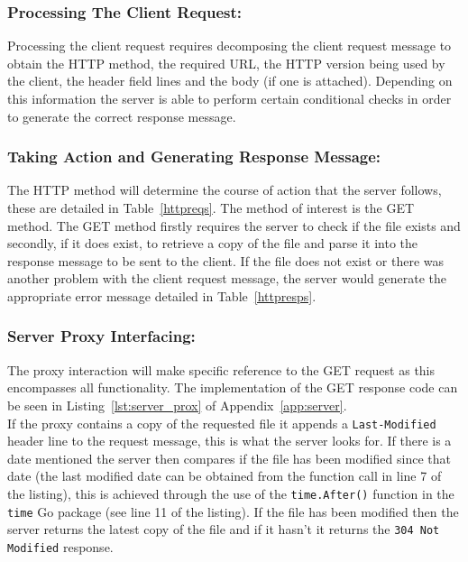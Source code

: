 \documentclass[10pt,twocolumn]{witseiepaper}
\begin{document}
		\subsubsection*{Processing The Client Request:} Processing the client request requires decomposing the client request message to obtain the HTTP method, the required URL, the HTTP version being used by the client, the header field lines and the body (if one is attached). Depending on this information the server is able to perform certain conditional checks in order to generate the correct response message. 
		
		\subsubsection*{Taking Action and Generating Response Message:} The HTTP method will determine the course of action that the server follows, these are detailed in Table~\ref{httpreqs}. The method of interest is the GET method. The GET method firstly requires the server to check if the file exists and secondly, if it does exist, to retrieve a copy of the file and parse it into the response message to be sent to the client. If the file does not exist or there was another problem with the client request message, the server would generate the appropriate error message detailed in Table~\ref{httpresps}.
		
		\subsubsection*{Server Proxy Interfacing:} The proxy interaction will make specific reference to the GET request as this encompasses all functionality. The implementation of the GET response code can be seen in Listing~\ref{lst:server_prox} of Appendix~\ref{app:server}. \\
		
		If the proxy contains a copy of the requested file it appends a \texttt{Last-Modified} header line to the request message, this is what the server looks for. If there is a date mentioned the server then compares if the file has been modified since that date (the last modified date can be obtained from the function call in line 7 of the listing), this is achieved through the use of the \texttt{time.After()} function in the \texttt{time} Go package (see line 11 of the listing). If the file has been modified then the server returns the latest copy of the file and if it hasn't it returns the \texttt{304 Not Modified} response. \\
		
\end{document}
